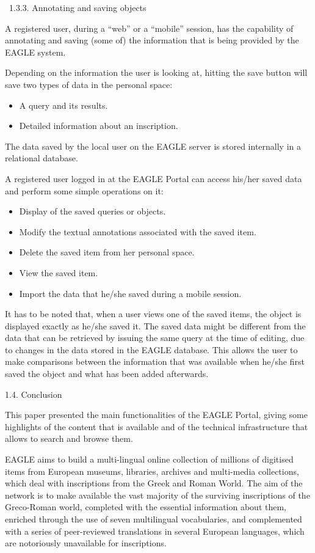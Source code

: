 \documentclass[amsthm,ebook]{saparticle}
\begin{document}
\bigskip

\ 1.3.3. Annotating and saving objects


\bigskip

A registered user, during a “web” or a “mobile” session, has the capability of annotating and saving (some of) the
information that is being provided by the EAGLE system.

Depending on the information the user is looking at, hitting the save button will save two types of data in the personal
space: 

\begin{itemize}
\item A query and its results.
\item Detailed information about an inscription.
\end{itemize}
The data saved by the local user on the EAGLE server is stored internally in a relational database.

A registered user logged in at the EAGLE Portal can access his/her saved data and perform some simple operations on it:

\begin{itemize}
\item Display of the saved queries or objects.
\item Modify the textual annotations associated with the saved item.
\item Delete the saved item from her personal space.
\item View the saved item.
\item Import the data that he/she saved during a mobile session.
\end{itemize}
It has to be noted that, when a user views one of the saved items, the object is displayed exactly as he/she saved it.
The saved data might be different from the data that can be retrieved by issuing the same query at the time of editing,
due to changes in the data stored in the EAGLE database. This allows the user to make comparisons between the
information that was available when he/she first saved the object and what has been added afterwards.

1.4. Conclusion

This paper presented the main functionalities of the EAGLE Portal, giving some highlights of the content that is
available and of the technical infrastructure that allows to search and browse them.

EAGLE aims to build a multi-lingual online collection of millions of digitised items from European museums, libraries,
archives and multi-media collections, which deal with inscriptions from the Greek and Roman World. The aim of the
network is to make available the vast majority of the surviving inscriptions of the Greco-Roman world, completed with
the essential information about them, enriched through the use of seven multilingual vocabularies, and complemented
with a series of peer-reviewed translations in several European languages, which are notoriously unavailable for
inscriptions. 
\end{document}
